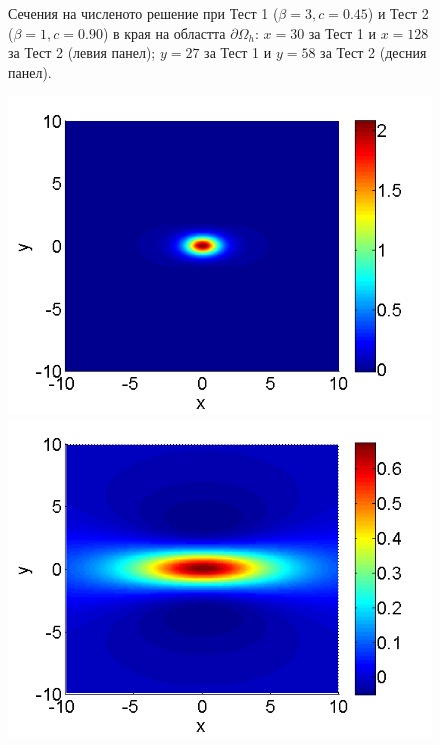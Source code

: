 \documentclass[a4paper]{article}
\theoremstyle{remark}
\begin{document}
\begin{large}
\begin{figure}[ht]
\begin{minipage}[b]{0.5\linewidth}
	\end{minipage}
	\caption{Сечения на численото решение при Тест 1 ($\beta=3, c=0.45$) и Тест 2 ($\beta=1, c=0.90$) в края на областта $\partial \Omega_h$:  $x=30$ за Тест 1 и $x=128$ за Тест 2 (левия панел);  $y=27$ за Тест 1 и $y=58$ за Тест 2 (десния панел).}
	\label{profilesOnBnd}
\end{figure}
\FloatBarrier
\fi
\begin{figure}[ht]
	\begin{minipage}[b]{0.5\linewidth}
		\raggedleft
		\includegraphics[width=\linewidth]{SolutionView/ChristovIC_30_bt3_c045_topview.png}
	\end{minipage}
	\begin{minipage}[b]{0.5\linewidth}
		\raggedright
		\includegraphics[width=\linewidth]{SolutionView/ChristovIC_128_bt1_c090_topview.png}

\end{minipage}
\end{figure}
\end{large}
\end{document}
